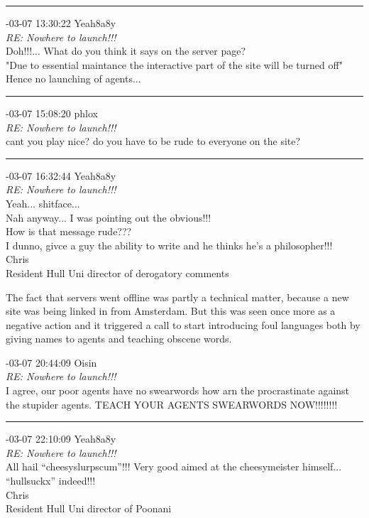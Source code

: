 \begin{mail}
\rule{0.8\textwidth}{.4pt}

{-03-07 13:30:22 Yeah8a8y}\\
{\itshape RE: Nowhere to launch!!!}\\
Doh!!!... What do you think it says on the server page?\\
"Due to essential maintance the interactive part of the site will be turned off"\\
Hence no launching of agents...\\

\rule{0.8\textwidth}{.4pt}

{-03-07 15:08:20 phlox}\\
{\itshape RE: Nowhere to launch!!!}\\
cant you play nice? do you have to be rude to everyone on the site?\\

\rule{0.8\textwidth}{.4pt}

{-03-07 16:32:44 Yeah8a8y}\\
{\itshape RE: Nowhere to launch!!!}\\
Yeah... shitface...\\
Nah anyway... I was pointing out the obvious!!!\\
How is that message rude???\\
I dunno, givce a guy the ability to write and he thinks he's a philosopher!!!\\
Chris\\
Resident Hull Uni director of derogatory comments
\end{mail}

The fact that servers went offline was partly a technical matter, because a new site was being linked in from Amsterdam. 
But this was seen once more as a negative action and it triggered a call to start 
introducing foul languages both by giving names to agents and teaching obscene words. 

\begin{mail}

{-03-07 20:44:09 Oisin}\\
{\itshape RE: Nowhere to launch!!!}\\
I agree, our poor agents have no swearwords how arn the procrastinate against the stupider agents. TEACH YOUR AGENTS SWEARWORDS NOW!!!!!!!! \\

\rule{0.8\textwidth}{.4pt}

{-03-07 22:10:09 Yeah8a8y}\\
{\itshape RE: Nowhere to launch!!!}\\
All hail ``cheesyslurpscum''!!!  Very good aimed at the cheesymeister himself... ``hullsuckx'' indeed!!!\\
Chris\\
Resident Hull Uni director of Poonani
%
\end{mail}

